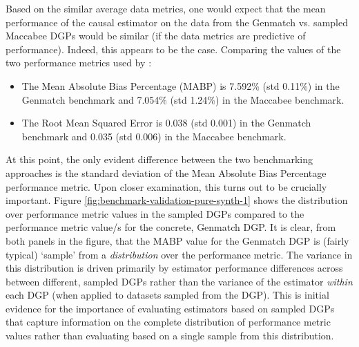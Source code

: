 \documentclass[../main.tex]{subfiles}
\begin{document}
Based on the similar average data metrics, one would expect that the mean performance of the causal estimator on the data from the Genmatch vs. sampled Maccabee DGPs would be similar (if the data metrics are predictive of performance). Indeed, this appears to be the case. Comparing the values of the two performance metrics used by \citeauthor{Diamond2013GeneticStudies}:

\begin{itemize}
    \item The Mean Absolute Bias Percentage (MABP) is 7.592\% (std 0.11\%) in the Genmatch benchmark and 7.054\% (std 1.24\%) in the Maccabee benchmark.
    
    \item The Root Mean Squared Error is 0.038 (std 0.001) in the Genmatch benchmark and 0.035 (std 0.006) in the Maccabee benchmark.
\end{itemize}

At this point, the only evident difference between the two benchmarking approaches is the standard deviation of the Mean Absolute Bias Percentage performance metric. Upon closer examination, this turns out to be crucially important. Figure \ref{fig:benchmark-validation-pure-synth-1} shows the distribution over performance metric values in the sampled DGPs compared to the performance metric value/s for the concrete, Genmatch DGP. It is clear, from both panels in the figure, that the MABP value for the Genmatch DGP is (fairly typical) `sample' from a \textit{distribution} over the performance metric. The variance in this distribution is driven primarily by estimator performance differences across between different, sampled DGPs rather than the variance of the estimator \textit{within} each DGP (when applied to datasets sampled from the DGP). This is initial evidence for the importance of evaluating estimators based on sampled DGPs that capture information on the complete distribution of performance metric values rather than evaluating based on a single sample from this distribution.

\vspace{\baselineskip}
\end{document}
